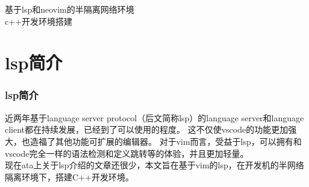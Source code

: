 \documentclass[aspectratio=169,fontset=windows,UTF-8,10pt,xcolor={usenames,dvipsnames,svgnames,x11names}]{beamer}
\begin{document}
{
    \begin{frame}[fragile]
        \begin{center}
        \Large 
            基于lsp和neovim的半隔离网络环境\\
                     c++开发环境搭建
            \\[4\baselineskip]
        \end{center}
    \end{frame}
}


\section[Contents]{}
\frame 
{
    \frametitle{\secname}
    \tableofcontents[pausesections]
}


\section{lsp简介}
\begin{frame}[fragile]
    \frametitle{lsp简介}
    \setlength{\parindent}{2em}
    近两年基于language server protocol（后文简称lsp）的language server和language client都在持续发展，已经到了可以使用的程度。
    这不仅使vscode的功能更加强大，也造福了其他功能可扩展的编辑器。
    对于vim而言，受益于lsp，可以拥有和vscode完全一样的语法检测和定义跳转等的体验，并且更加轻量。
    \\[1\baselineskip]
    现在ata上关于lsp介绍的文章还很少，本文旨在基于vim的lsp，在开发机的半网络隔离环境下，搭建C++开发环境。
\end{frame}
\end{document}
